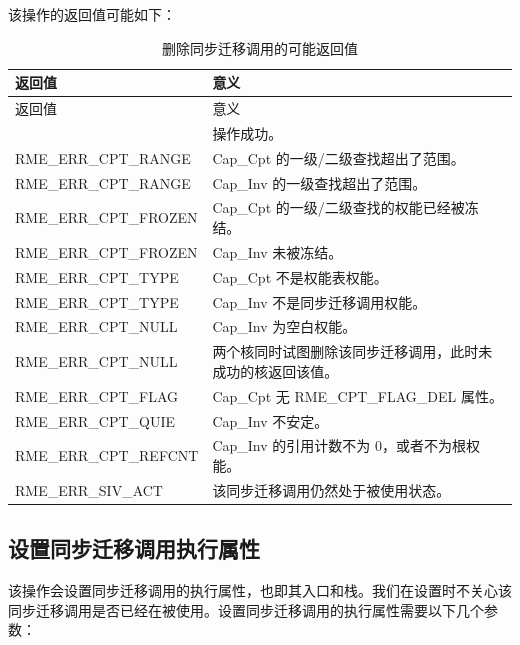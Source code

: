 该操作的返回值可能如下：

\begin{xltabular}{\textwidth}{@{}>{\hsize\raggedright\arraybackslash}X>{\hsize\raggedright\arraybackslash}X@{}}
\caption{删除同步迁移调用的可能返回值}\label{tab:5-7-delete-sync-invocation-return-values}\\
\toprule
返回值 & 意义\tabularnewline
\endfirsthead
\toprule
返回值 & 意义\tabularnewline
\midrule
\endhead
\bottomrule
{} & 操作成功。\tabularnewline
    RME\_ERR\_CPT\_RANGE & Cap\_Cpt 的一级/二级查找超出了范围。\tabularnewline
    RME\_ERR\_CPT\_RANGE & Cap\_Inv 的一级查找超出了范围。\tabularnewline
    RME\_ERR\_CPT\_FROZEN & Cap\_Cpt 的一级/二级查找的权能已经被冻结。\tabularnewline
    RME\_ERR\_CPT\_FROZEN & Cap\_Inv 未被冻结。\tabularnewline
    RME\_ERR\_CPT\_TYPE & Cap\_Cpt 不是权能表权能。\tabularnewline
    RME\_ERR\_CPT\_TYPE & Cap\_Inv 不是同步迁移调用权能。\tabularnewline
    RME\_ERR\_CPT\_NULL & Cap\_Inv 为空白权能。\tabularnewline
    RME\_ERR\_CPT\_NULL & 两个核同时试图删除该同步迁移调用，此时未成功的核返回该值。\tabularnewline
    RME\_ERR\_CPT\_FLAG & Cap\_Cpt 无 RME\_CPT\_FLAG\_DEL 属性。\tabularnewline
    RME\_ERR\_CPT\_QUIE & Cap\_Inv 不安定。\tabularnewline
    RME\_ERR\_CPT\_REFCNT & Cap\_Inv 的引用计数不为 0，或者不为根权能。\tabularnewline
    RME\_ERR\_SIV\_ACT & 该同步迁移调用仍然处于被使用状态。\tabularnewline
\bottomrule
\end{xltabular}

\subsection{设置同步迁移调用执行属性}\label{subsec:5-set-sync-invocation-properties}

该操作会设置同步迁移调用的执行属性，也即其入口和栈。我们在设置时不关心该同步迁移调用是否已经在被使用。设置同步迁移调用的执行属性需要以下几个参数：

